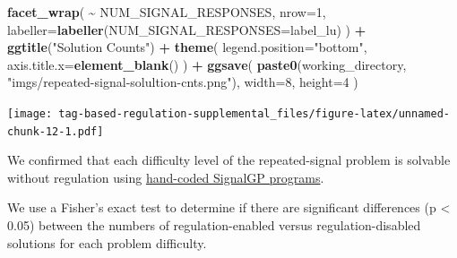 \documentclass[
]{book}
\newenvironment{Shaded}{\begin{snugshade}}{\end{snugshade}}
\newcommand{\DataTypeTok}[1]{\textcolor[rgb]{0.13,0.29,0.53}{#1}}
\newcommand{\DecValTok}[1]{\textcolor[rgb]{0.00,0.00,0.81}{#1}}
\newcommand{\KeywordTok}[1]{\textcolor[rgb]{0.13,0.29,0.53}{\textbf{#1}}}
\newcommand{\NormalTok}[1]{#1}
\newcommand{\OperatorTok}[1]{\textcolor[rgb]{0.81,0.36,0.00}{\textbf{#1}}}
\newcommand{\StringTok}[1]{\textcolor[rgb]{0.31,0.60,0.02}{#1}}
\begin{document}
\begin{Shaded}
\begin{Highlighting}[]
\StringTok{  }\KeywordTok{facet\_wrap}\NormalTok{(}
    \OperatorTok{\textasciitilde{}}\StringTok{ }\NormalTok{NUM\_SIGNAL\_RESPONSES,}
    \DataTypeTok{nrow=}\DecValTok{1}\NormalTok{,}
    \DataTypeTok{labeller=}\KeywordTok{labeller}\NormalTok{(}\DataTypeTok{NUM\_SIGNAL\_RESPONSES=}\NormalTok{label\_lu)}
\NormalTok{  ) }\OperatorTok{+}
\StringTok{  }\KeywordTok{ggtitle}\NormalTok{(}\StringTok{"Solution Counts"}\NormalTok{) }\OperatorTok{+}
\StringTok{  }\KeywordTok{theme}\NormalTok{(}
    \DataTypeTok{legend.position=}\StringTok{"bottom"}\NormalTok{,}
    \DataTypeTok{axis.title.x=}\KeywordTok{element\_blank}\NormalTok{()}
\NormalTok{  ) }\OperatorTok{+}
\StringTok{  }\KeywordTok{ggsave}\NormalTok{(}
    \KeywordTok{paste0}\NormalTok{(working\_directory, }\StringTok{"imgs/repeated{-}signal{-}solultion{-}cnts.png"}\NormalTok{),}
    \DataTypeTok{width=}\DecValTok{8}\NormalTok{,}
    \DataTypeTok{height=}\DecValTok{4}
\NormalTok{  )}
\end{Highlighting}
\end{Shaded}

\texttt{[image: tag-based-regulation-supplemental\_files/figure-latex/unnamed-chunk-12-1.pdf]}

We confirmed that each difficulty level of the repeated-signal problem is solvable without regulation using \href{https://github.com/amlalejini/Tag-based-Genetic-Regulation-for-LinearGP/blob/master/documents/handcoded-examples.md}{hand-coded SignalGP programs}.

We use a Fisher's exact test to determine if there are significant differences (p \textless{} 0.05) between the numbers of regulation-enabled versus regulation-disabled solutions for each problem difficulty.
\end{document}
